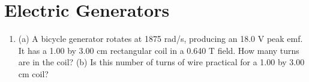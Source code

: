 \documentclass{article}
\begin{document}
\section{Electric Generators}

\begin{enumerate}
\item (a) A bicycle generator rotates at 1875 rad/s, producing an 18.0 V peak emf. It has a 1.00 by 3.00 cm rectangular coil in a 0.640 T field. How many turns are in the coil? (b) Is this number of turns of wire practical for a 1.00 by 3.00 cm coil? \\ \vspace{4cm}
\end{enumerate}
\end{document}
